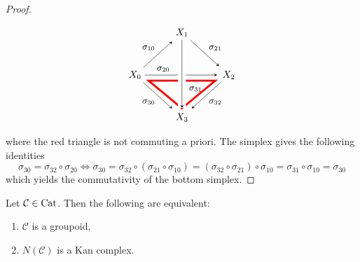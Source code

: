 \begin{proof}
    \[
        \begin{tikzpicture}[>=stealth,->,shorten >=2pt,looseness=.5,auto]
            \matrix[anchor=center, column sep=1cm, row sep=1cm] at (0,0)
            {
                                & \node(X_1) {$X_1$};   &                 \\
             \node(X_0) {$X_0$};     &                  & \node(X_2) {$X_2$};  \\
                                & \node(X_3) {$X_3$};   &                 \\
            };
            \draw[line width=2pt,color=red] (-1.2,-0.2) -- (1.2,-0.2) -- (0,-1.2) -- cycle;
            \begin{scope}[every node/.style={font=\small\itshape}]
                \draw (X_1) -- node [midway] {$\sigma_{21}$} (X_2);
                \draw (X_0) -- node [midway] {$\sigma_{10}$} (X_1);
                \draw (X_0) -- node [midway, swap] {$\sigma_{30}$}(X_3);
                \draw (X_0) -- node [near start] {$\sigma_{20}$}(X_2);
                \draw [-,line width=8pt,draw=white]
                (X_1) -- node [pos=0.7] {$\sigma_{31}$} (X_3);
                \draw (X_1) -- (X_3);
                \draw (X_2) -- node [midway] {$\sigma_{32}$} (X_3);
            \end{scope}
        \end{tikzpicture}              
    \]
    where the red triangle is not commuting a priori.
    The simplex gives the following identities
    \[
    \sigma_{30} = \sigma_{32} \circ \sigma_{20} \iff \sigma_{30} = \sigma_{32} \circ (\sigma_{21} \circ \sigma_{10}) = (\sigma_{32} \circ \sigma_{21}) \circ \sigma_{10} = \sigma_{31} \circ \sigma_{10} = \sigma_{30}
    \]
    which yields the commutativity of the bottom simplex.
\end{proof}

\begin{prop}
    Let $\mathcal{C} \in \operatorname{Cat} $. Then the following are equivalent:
    \begin{enumerate}
        \item 
        $\mathcal{C}$ is a groupoid,
        \item 
        $N(\mathcal{C})$ is a Kan complex.
    \end{enumerate}
\end{prop}


